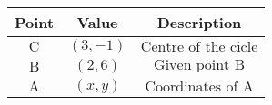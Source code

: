 
    \begin{tabular}{ |c|c|c| }
        \hline
	    \textbf{Point} & \textbf{Value} & \textbf{Description}\\ 
        \hline
	    $\text{C}$ & $(3, -1)$ & $\text{Centre of the cicle}$ \\ 
        \hline
	    $\text{B}$ & $(2, 6)$ & $\text{Given point B}$ \\ 
        \hline
	    $\text{A}$ & $(x, y)$ & $\text{Coordinates of A}$ \\ 
        \hline
    \end{tabular}


